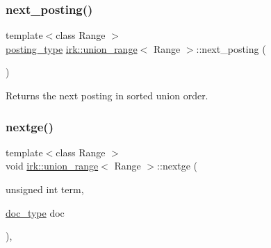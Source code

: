 \mbox{\label{classirk_1_1union__range_a3513c7a28c0e241a6f9ccfc5bf7b6e67}} 
\subsubsection{\texorpdfstring{next\+\_\+posting()}{next\_posting()}}
{\footnotesize\ttfamily template$<$class Range $>$ \\
\mbox{\hyperlink{classirk_1_1union__range_ac125c83e17d473ee5480fef76cfe42f9}{posting\+\_\+type}} \mbox{\hyperlink{classirk_1_1union__range}{irk\+::union\+\_\+range}}$<$ Range $>$\+::next\+\_\+posting (\begin{DoxyParamCaption}{ }\end{DoxyParamCaption})\hspace{0.3cm}{\ttfamily [inline]}}



Returns the next posting in sorted union order. 

\mbox{\label{classirk_1_1union__range_ad195345c32357a6269333a45dd785da8}} 
\subsubsection{\texorpdfstring{nextge()}{nextge()}}
{\footnotesize\ttfamily template$<$class Range $>$ \\
void \mbox{\hyperlink{classirk_1_1union__range}{irk\+::union\+\_\+range}}$<$ Range $>$\+::nextge (\begin{DoxyParamCaption}\item[{unsigned int}]{term,  }\item[{\mbox{\hyperlink{classirk_1_1union__range_aa502a10f2f5c682199072c0ba11a77a9}{doc\+\_\+type}}}]{doc }\end{DoxyParamCaption})\hspace{0.3cm}{\ttfamily [inline]}, {\ttfamily [protected]}}

\mbox{\label{classirk_1_1union__range_a634d96d13219c2856a6bedf37cd8f1de}} 
